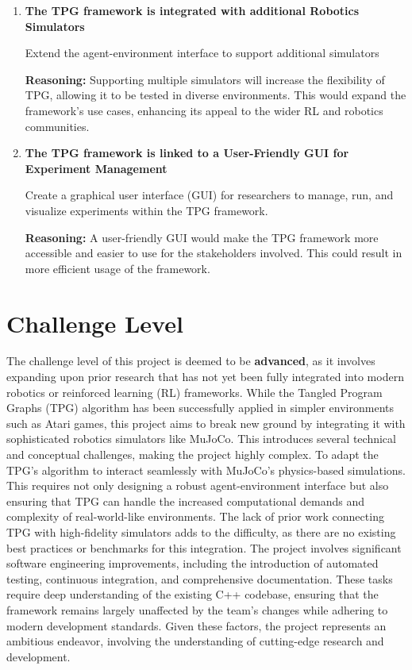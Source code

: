 \documentclass{article}
\begin{document}
    \begin{enumerate}
        \item \textbf{The TPG framework is integrated with additional Robotics Simulators}

Extend the agent-environment interface to support additional simulators

\textbf{Reasoning:} Supporting multiple simulators will increase the flexibility of TPG, allowing it to be tested in diverse environments. This would expand the framework’s use cases, enhancing its appeal to the wider RL and robotics communities.




          \item \textbf{The TPG framework is linked to a User-Friendly GUI for Experiment Management}
          
Create a graphical user interface (GUI) for researchers to manage, run, and visualize experiments within the TPG framework.

\textbf{Reasoning:} A user-friendly GUI would make the TPG framework more accessible and easier to use for the stakeholders involved. This could result in more efficient usage of the framework.

    \end{enumerate}

\section{Challenge Level}

The challenge level of this project is deemed to be \textbf{advanced}, as it involves expanding upon prior research that has not yet been fully integrated into modern robotics or reinforced learning (RL) frameworks. While the Tangled Program Graphs (TPG) algorithm has been successfully applied in simpler environments such as Atari games, this project aims to break new ground by integrating it with sophisticated robotics simulators like MuJoCo. This introduces several technical and conceptual challenges, making the project highly complex.
To adapt the TPG’s algorithm to interact seamlessly with MuJoCo’s physics-based simulations. This requires not only designing a robust agent-environment interface but also ensuring that TPG can handle the increased computational demands and complexity of real-world-like environments. The lack of prior work connecting TPG with high-fidelity simulators adds to the difficulty, as there are no existing best practices or benchmarks for this integration.
The project involves significant software engineering improvements, including the introduction of automated testing, continuous integration, and comprehensive documentation. These tasks require deep understanding of the existing C++ codebase, ensuring that the framework remains largely unaffected by the team’s changes while adhering to modern development standards.
Given these factors, the project represents an ambitious endeavor, involving the understanding of cutting-edge research and development. 
\end{document}
